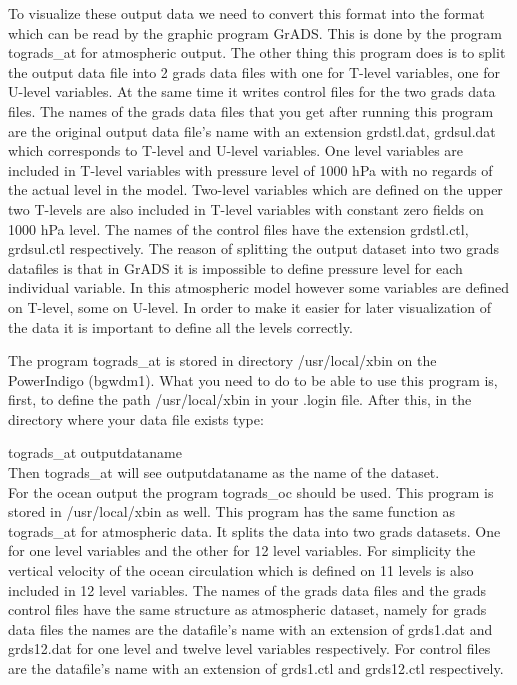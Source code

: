 To visualize these output data we need to convert this format into the format which can be read by
the graphic program GrADS. This is done by the program tograds\_at for atmospheric output.
The other thing this program does is to split the output data file into 2 grads data files with
one for T-level variables, one for U-level variables.
At the same time it writes control 
files for the two grads data files. The names of the grads data files
that you get after running this program are the original output data file's name 
with an extension grdstl.dat, grdsul.dat which corresponds to 
T-level and U-level variables.  One level variables are included in T-level variables with pressure 
level of 1000 hPa with no regards of the actual level in 
the model. Two-level variables which are defined on the upper two T-levels
are also included in T-level variables with constant zero fields on 1000 hPa level.  The names of the control
files have the extension grdstl.ctl, grdsul.ctl respectively. The reason of splitting the output dataset into
two grads datafiles is that in GrADS it is impossible to define pressure level for each
individual variable. In this atmospheric model however some  variables
are defined on T-level, some on U-level.
\newpage
In order to make it easier for
later visualization of the data it is important to define all the levels 
correctly. 

The program tograds\_at is stored in directory /usr/local/xbin on the PowerIndigo (bgwdm1). What
you need to do to be able to use this program is, first, to define the path /usr/local/xbin in your 
.login file. After this, in the directory where your data file exists
type:

tograds\_at outputdataname 
\\
Then tograds\_at will see outputdataname as the name of the dataset.
\\
For the ocean output the program tograds\_oc should be used. This program is stored in /usr/local/xbin as 
well. This program has the same function as tograds\_at for atmospheric data. It splits the data 
into two grads datasets. One for one level variables and the other for 12 level variables. 
For simplicity the vertical velocity of the ocean circulation which is defined on 11 levels is also
included in 12 level variables. The names of the grads data files and the grads control files have 
the same structure as atmospheric dataset, namely for grads data files the names are the
datafile's name with an extension of grds1.dat and grds12.dat for one level and twelve level variables 
respectively. For control files are the datafile's name with an extension of grds1.ctl and grds12.ctl
respectively. 

